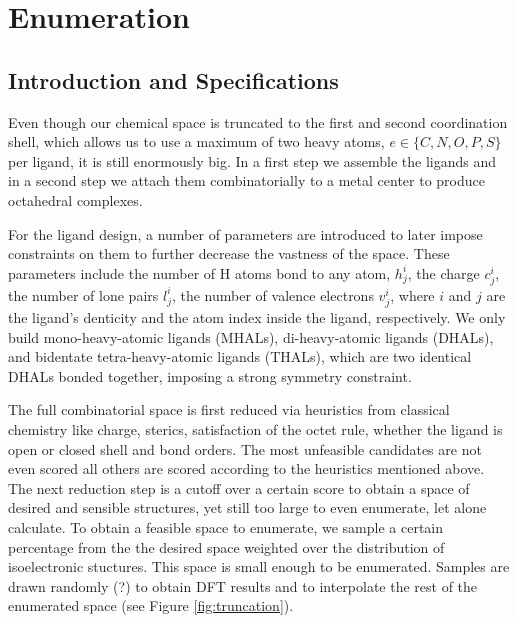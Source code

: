 \documentclass[]{article}
\begin{document}
\section{Enumeration}
\subsection{Introduction and Specifications}
Even though our chemical space is truncated to the first and second coordination shell, which allows us to use a maximum of two heavy atoms, $e \in \{C,N,O,P,S\} $ per ligand, it is still enormously big. In a first step we assemble the ligands and in a second step we attach them combinatorially to a metal center to produce octahedral complexes. 

For the ligand design, a number of parameters are introduced to later impose constraints on them to further decrease the vastness of the space. These parameters include the number of H atoms bond to any atom, $h^i_j$, the charge $c^i_j$, the number of lone pairs $l^i_j$, the number of valence electrons $v^i_j$, where $i$ and $j$ are the ligand's denticity and the atom index inside the ligand, respectively. We only build mono-heavy-atomic ligands (MHALs), di-heavy-atomic ligands (DHALs), and bidentate tetra-heavy-atomic ligands (THALs), which are two identical DHALs bonded together, imposing a strong symmetry constraint.

The full combinatorial space is first reduced via heuristics from classical chemistry like charge, sterics, satisfaction of the octet rule, whether the ligand is open or closed shell and bond orders. The most unfeasible candidates are not even scored all others are scored according to the heuristics mentioned above. The next reduction step is a cutoff over a certain score to obtain a space of desired and sensible structures, yet still too large to even enumerate, let alone calculate. To obtain a feasible space to enumerate, we sample a certain percentage from the the desired space weighted over the distribution of isoelectronic stuctures. This space is small enough to be enumerated. Samples are drawn randomly (?) to obtain DFT results and to interpolate the rest of the enumerated space (see Figure \ref{fig:truncation}).
 
\end{document}
